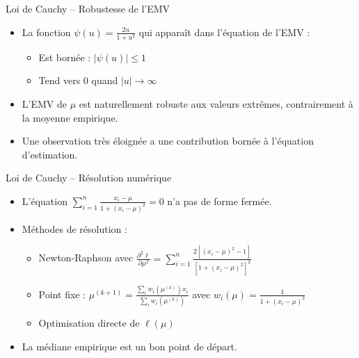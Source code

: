 \documentclass[11pt,aspectratio=169]{beamer}
\begin{document}
\begin{frame}{Loi de Cauchy -- Robustesse de l'EMV}

\begin{itemize}

\item La fonction $\psi(u) = \frac{2u}{1+u^2}$ qui apparaît dans l'équation de l'EMV :\newline
  \begin{itemize}
    \item Est bornée : $|\psi(u)| \leq 1$\newline
    \item Tend vers 0 quand $|u| \to \infty$\newline
  \end{itemize}

\item L'EMV de $\mu$ est naturellement robuste aux valeurs extrêmes, contrairement à la moyenne empirique.\newline

\item Une observation très éloignée a une contribution bornée à l'équation d'estimation.

\end{itemize}

\end{frame}

\begin{frame}{Loi de Cauchy -- Résolution numérique}

\begin{itemize}

\item L'équation $\sum_{i=1}^n \frac{x_i - \mu}{1 + (x_i - \mu)^2} = 0$ n'a pas de forme fermée.\newline

\item Méthodes de résolution :\newline
  \begin{itemize}
    \item Newton-Raphson avec $\frac{\partial^2 \ell}{\partial \mu^2} = \sum_{i=1}^n \frac{2[(x_i-\mu)^2 - 1]}{[1 + (x_i - \mu)^2]^2}$\newline
    \item Point fixe : $\mu^{(k+1)} = \frac{\sum_i w_i(\mu^{(k)}) x_i}{\sum_i w_i(\mu^{(k)})}$ avec $w_i(\mu) = \frac{1}{1+(x_i-\mu)^2}$\newline
    \item Optimisation directe de $\ell(\mu)$\newline
  \end{itemize}

\item La médiane empirique est un bon point de départ.

\end{itemize}

\end{frame}
\end{document}
